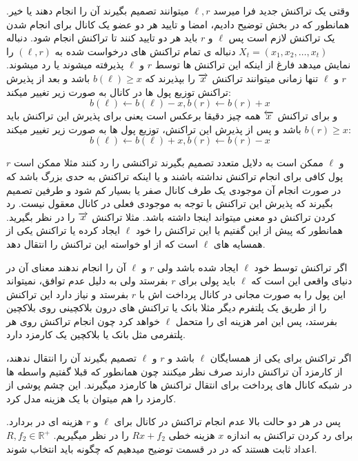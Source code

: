 وقتی یک تراکنش جدید فرا میرسد 
$\ell , r$ 
میتوانند تصمیم بگیرند آن را انجام دهند یا خیر. همانطور که در بخش  توضیح دادیم، امضا و تایید هر دو عضو یک کانال برای انجام شدن یک تراکنش لازم است پس 
$\ell$ و $r$
باید هر دو تایید کنند تا تراکنش انجام شود. دنباله
$X_t=(x_1,x_2,\dots,x_t)$
دنباله ی تمام تراکنش های درخواست شده به 
$(\ell , r)$
را نمایش میدهد فارغ از اینکه این تراکنش ها توسط 
$r$ و $\ell$
پذیرفته میشوند یا رد میشوند. 
$r$ و $\ell$
تنها زمانی میتوانند تراکنش $\overrightarrow{x}$ را بپذیرند که
$b(\ell) \geq x$
باشد و بعد از پذیرش تراکنش توزیع پول ها در کانال به صورت زیر تغییر میکند:
$$b(\ell) \leftarrow b(\ell) - x  , b(r) \leftarrow b(r) + x $$
و برای تراکنش $\overleftarrow{x}$ همه چیز دقیقا برعکس است یعنی برای پذیرش این تراکنش باید 
$b(r) \geq x$
باشد و پس از پذیرش این تراکنش، توزیع پول ها به صورت زیر تغییر میکند:
$$b(\ell) \leftarrow b(\ell) + x  , b(r) \leftarrow b(r) - x $$

$r$ و $\ell$
ممکن است به دلایل متعدد تصمیم بگیرند تراکنشی را رد کنند مثلا ممکن است پول کافی برای انجام تراکنش نداشته باشند و یا اینکه تراکنش به حدی بزرگ باشد که در صورت انجام آن موجودی یک طرف کانال صفر یا بسیار کم شود و طرفین تصمیم بگیرند که پذیرش این تراکنش با توجه به موجودی فعلی در کانال معقول نیست.
رد کردن تراکنش دو معنی میتواند اینجا داشته باشد. مثلا تراکنش
$\overrightarrow{x}$
را در نظر بگیرید. همانطور که پیش از این گفتیم یا این تراکنش را خود
$\ell$
ایجاد کرده یا تراکنش یکی از همسایه های 
$\ell$
است که از او خواسته این تراکنش را انتقال دهد.

\begin{شمارش}
 اگر تراکنش توسط خود 
$\ell$
ایجاد شده باشد ولی 
$r$ و $\ell$
آن را انجام ندهند معنای آن در دنیای واقعی این است که 
$\ell$ 
باید پولی برای 
$r$ 
 بفرستد ولی به دلیل عدم توافق، نمیتواند این پول را به صورت مجانی در کانال پرداخت اش با 
$r$ 
بفرستد و نیاز دارد این تراکنش را از طریق یک پلتفرم دیگر مثلا بانک یا تراکنش های درون بلاکچینی روی بلاکچین بفرستد، پس این امر هزینه ای را متحمل $\ell$  خواهد کرد چون انجام تراکنش روی هر پلتفرمی مثل بانک یا بلاکچین یک کارمزد دارد.

 اگر تراکنش برای یکی از همسایگان $\ell$ باشد و 
$r$ و $\ell$
تصمیم بگیرند آن را انتقال ندهند، از کارمزد آن تراکنش دارند صرف نظر میکنند چون همانطور که قبلا گفتیم واسطه ها در شبکه کانال های پرداخت برای انتقال تراکنش ها کارمزد میگیرند. این چشم پوشی از کارمزد را هم میتوان با یک هزینه مدل کرد.
\end{شمارش}

پس در هر دو حالت بالا عدم انجام تراکنش در کانال برای  $\ell$ و $r$  هزینه ای در بردارد. برای رد کردن تراکنش به اندازه $x$ هزینه خطی 
$Rx+f_2$
را در نظر میگیریم.  
$R , f_2 \in \mathbb{R}^+$
اعداد ثابت هستند که در در قسمت   توضیح میدهیم که چگونه باید انتخاب شوند. 

